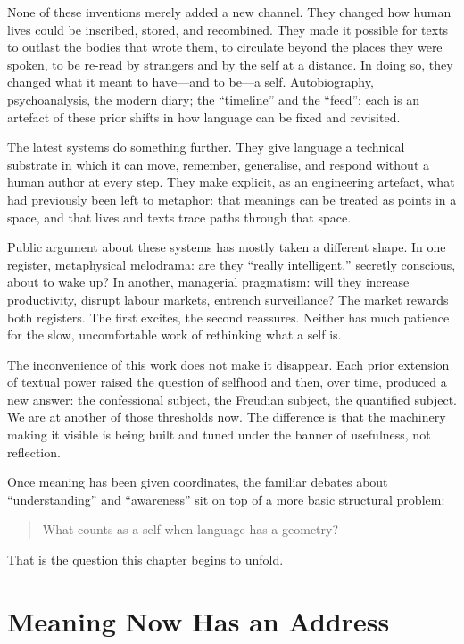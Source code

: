\documentclass[12pt,a4paper]{report}
\begin{document}
None of these inventions merely added a new channel. They changed how human lives could be inscribed, stored, and recombined. They made it possible for texts to outlast the bodies that wrote them, to circulate beyond the places they were spoken, to be re-read by strangers and by the self at a distance. In doing so, they changed what it meant to have---and to be---a self. Autobiography, psychoanalysis, the modern diary; the ``timeline'' and the ``feed'': each is an artefact of these prior shifts in how language can be fixed and revisited.

The latest systems do something further. They give language a technical substrate in which it can move, remember, generalise, and respond without a human author at every step. They make explicit, as an engineering artefact, what had previously been left to metaphor: that meanings can be treated as points in a space, and that lives and texts trace paths through that space.

Public argument about these systems has mostly taken a different shape. In one register, metaphysical melodrama: are they ``really intelligent,'' secretly conscious, about to wake up? In another, managerial pragmatism: will they increase productivity, disrupt labour markets, entrench surveillance? The market rewards both registers. The first excites, the second reassures. Neither has much patience for the slow, uncomfortable work of rethinking what a self is.

The inconvenience of this work does not make it disappear. Each prior extension of textual power raised the question of selfhood and then, over time, produced a new answer: the confessional subject, the Freudian subject, the quantified subject. We are at another of those thresholds now. The difference is that the machinery making it visible is being built and tuned under the banner of usefulness, not reflection.

Once meaning has been given coordinates, the familiar debates about ``understanding'' and ``awareness'' sit on top of a more basic structural problem:

\begin{quote}
What counts as a self when language has a geometry?
\end{quote}

That is the question this chapter begins to unfold.

\section{Meaning Now Has an Address}
\end{document}
